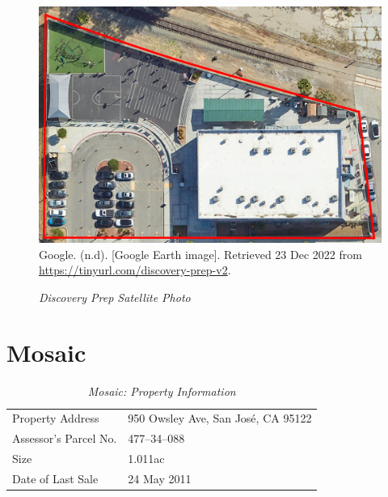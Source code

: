 \begin{figure}[hbt]
  \caption[Discovery Prep Satellite Photo]{\textit{Discovery Prep Satellite Photo}}\label{fig:discovery-prep-sat-photo}
  \includegraphics[width=\textwidth]{Satellite-Photos/discovery-prep-sat-photo}\\ %
  \footnotesize{Google. (n.d). [Google Earth image]. Retrieved 23 Dec 2022 from \url{https://tinyurl.com/discovery-prep-v2}.}
\end{figure}


\clearpage
\section{Mosaic}\label{sec:mosaic-info}
\begin{table}[htb]
  \SingleSpacing%
  \caption[Mosaic: Property Information]{\textit{Mosaic: Property Information}}\label{tab:mosaic-prop-info}
  \begin{tabular}{ll}
    \toprule
    Property Address      & 950 Owsley Ave, San José, CA 95122 \\
    Assessor's Parcel No. & 477–34–088 \\
    Size                  & 1.011ac \\
    Date of Last Sale     & 24 May 2011 \\
    \bottomrule
  \end{tabular}
\end{table}

